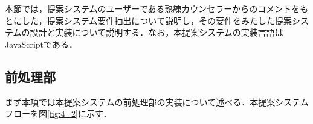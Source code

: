 \documentclass[shuuron]{kuee}
\begin{document}
本節では，提案システムのユーザーである熟練カウンセラーからのコメントをもとにした，提案システム要件抽出について説明し，その要件をみたした提案システムの設計と実装について説明する．なお，本提案システムの実装言語はJavaScriptである．




\subsection{前処理部}

まず本項では本提案システムの前処理部の実装について述べる．本提案システムフローを図\ref{fig:4_2}に示す．







\end{document}
